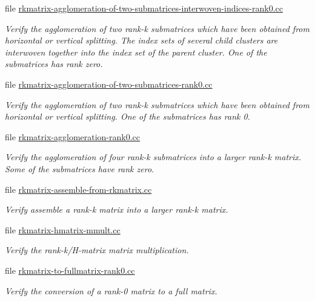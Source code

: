 \begin{DoxyCompactItemize}
file \hyperlink{rkmatrix-agglomeration-of-two-submatrices-interwoven-indices-rank0_8cc}{rkmatrix-\/agglomeration-\/of-\/two-\/submatrices-\/interwoven-\/indices-\/rank0.\+cc}
\begin{DoxyCompactList}\small\item\em Verify the agglomeration of two rank-\/k submatrices which have been obtained from horizontal or vertical splitting. The index sets of several child clusters are interwoven together into the index set of the parent cluster. One of the submatrices has rank zero. \end{DoxyCompactList}\item 
file \hyperlink{rkmatrix-agglomeration-of-two-submatrices-rank0_8cc}{rkmatrix-\/agglomeration-\/of-\/two-\/submatrices-\/rank0.\+cc}
\begin{DoxyCompactList}\small\item\em Verify the agglomeration of two rank-\/k submatrices which have been obtained from horizontal or vertical splitting. One of the submatrices has rank 0. \end{DoxyCompactList}\item 
file \hyperlink{rkmatrix-agglomeration-rank0_8cc}{rkmatrix-\/agglomeration-\/rank0.\+cc}
\begin{DoxyCompactList}\small\item\em Verify the agglomeration of four rank-\/k submatrices into a larger rank-\/k matrix. Some of the submatrices have rank zero. \end{DoxyCompactList}\item 
file \hyperlink{rkmatrix-assemble-from-rkmatrix_8cc}{rkmatrix-\/assemble-\/from-\/rkmatrix.\+cc}
\begin{DoxyCompactList}\small\item\em Verify assemble a rank-\/k matrix into a larger rank-\/k matrix. \end{DoxyCompactList}\item 
file \hyperlink{rkmatrix-hmatrix-mmult_8cc}{rkmatrix-\/hmatrix-\/mmult.\+cc}
\begin{DoxyCompactList}\small\item\em Verify the rank-\/k/\+H-\/matrix matrix multiplication. \end{DoxyCompactList}\item 
file \hyperlink{rkmatrix-to-fullmatrix-rank0_8cc}{rkmatrix-\/to-\/fullmatrix-\/rank0.\+cc}
\begin{DoxyCompactList}\small\item\em Verify the conversion of a rank-\/0 matrix to a full matrix. \end{DoxyCompactList}\item 

\end{DoxyCompactItemize}
